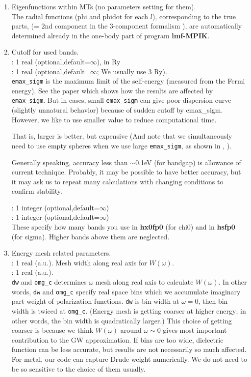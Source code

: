 \documentclass[a4paper,10pt,epsf,fleqn]{article}
\newcommand{\keyw}[1]{\fbox{\tt #1}}
\newcommand{\exe}[1]{{\bf #1}}
\begin{document}
{\begin{enumerate}
\item Eigenfunctions within MTs (no parameters setting for them).\\
The radial functions (phi and phidot for each $l$), 
corresponding to the true parts, 
(= 2nd component in the 3-component formalism \cite{xxx}),
are automatically determined already in the one-body part of program \exe{lmf-MPIK}.


\item
Cutoff for used bands.\\
\keyw{emax\_chi0}: 1 real (optional,default=$\infty$), in Ry\\

\keyw{emax\_sigm}: 1 real (optional,default=$\infty$; We usually use 3 Ry).\\
\verb+emax_sigm+ is the maximum limit of the self-energy 
(measured from the Fermi energy). See the paper \cite{xxx} which shows
how the results are affected by {\tt emax\_sigm}.
But in cases, small \verb+emax_sigm+ can give poor dispersion curve
(slightly unnatural behavior) because of sudden cutoff by emax\_sigm.
However, we like to use smaller value to reduce computational time.

That is, larger is better, but expensive (And note that 
we simultaneously need to use empty spheres when we use large
{\tt emax\_sigm}, as shown in \cite{xxx}, ). 

Generally speaking, accuracy less than $\sim $0.1eV (for bandgap) 
is allowance of current technique. Probably, it may be possible 
to have better accuracy, but it may ask us to repeat 
many calculations with changing conditions to confirm stability. 

\keyw{nband\_chi0}: 1 integer (optional,default=$\infty$)\\
\keyw{nband\_sigm}: 1 integer (optional,default=$\infty$)\\
These specify how many bands you use in {\bf hx0fp0} (for chi0) 
and in {\bf hsfp0} (for sigma). 
Higher bands above them are neglected.

\item 
Energy mesh related parameters.\\
\keyw{dw}     : 1 real (a.u.). Mesh width along real axis for $W(\omega)$.\\
\keyw{omg\_c} : 1 real (a.u.). \\
{\tt dw} and {\tt omg\_c}
determines $\omega$ mesh along real axis to calculate $W(\omega)$.
In other words, \verb+dw+ and \verb+omg_c+ specify real 
space bins which we accumulate imaginary part
weight of polarization functions. \verb+dw+ is bin width at
$\omega=0$, then bin width is twiced at \verb+omg_c+.
(Energy mesh is getting coarser at higher energy; in other words, 
the bin width is quadratically larger.)
This choice of getting coarser is because we think $W(\omega)$
around $\omega \sim 0$ gives most important contribution to the GW approximation.
If bins are too wide, dielectric function can be less accurate, 
but results are not necessarily so much affected. 
For metal, our code can capture Drude weight
numerically. We do not need to be so sensitive to the choice of
them usually.


\end{enumerate}}
\end{document}
